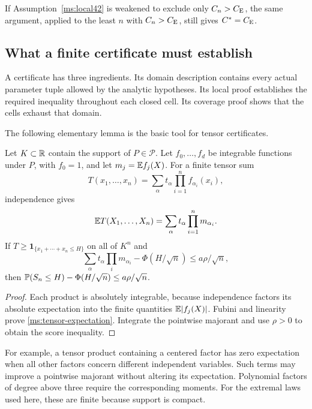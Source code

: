 If Assumption~\ref{ms:local42} is weakened to exclude only $C_n>C_{\mathrm E}$, the
same argument, applied to the least $n$ with $C_n>C_{\mathrm E}$, still gives
$C^*=C_{\mathrm E}$.

\subsection{What a finite certificate must establish}

A certificate has three ingredients. Its domain
description contains every actual parameter tuple allowed by the
analytic hypotheses. Its local proof establishes the required inequality
throughout each closed cell. Its coverage proof shows that the cells
exhaust that domain.

The following elementary lemma is the basic tool for tensor certificates.

\begin{lemma}
\label{ms:certificate-expectation}
Let $K\subset\mathbb R$ contain the support of $P\in\mathcal P$. Let
$f_0,\ldots,f_d$ be integrable functions under $P$, with $f_0=1$, and let
$m_j=\mathbb E f_j(X)$. For a finite tensor sum
\[
 T(x_1,\ldots,x_n)=\sum_{\alpha}t_\alpha
                              \prod_{i=1}^n f_{\alpha_i}(x_i),
\]
independence gives
\begin{equation}
 \mathbb E T(X_1,\ldots,X_n)=\sum_\alpha t_\alpha\prod_{i=1}^n m_{\alpha_i}.
\label{ms:tensor-expectation}
\end{equation}
If $T\ge\mathbf1_{\{x_1+\cdots+x_n\le H\}}$ on all of $K^n$ and
\[
 \sum_\alpha t_\alpha\prod_i m_{\alpha_i}
         -\Phi(H/\sqrt n)\le a\rho/\sqrt n,
\]
then $\mathbb P(S_n\le H)-\Phi(H/\sqrt n)\le a\rho/\sqrt n$.
\end{lemma}
\begin{proof}
Each product is absolutely integrable, because independence factors its
absolute expectation into the finite quantities $\mathbb E|f_j(X)|$.
Fubini and linearity prove \eqref{ms:tensor-expectation}. Integrate the
pointwise majorant and use $\rho>0$ to obtain the score inequality.

\end{proof}

For example, a tensor product containing a centered factor has zero
expectation when all other factors concern different independent variables.
Such terms may improve a pointwise majorant without altering its expectation.
Polynomial factors of degree above three require the corresponding moments.
For the extremal laws used here, these are finite because support is compact.

